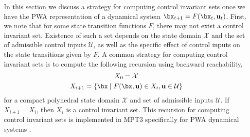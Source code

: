 In this section we discuss a strategy for computing control invariant sets once we have the PWA representation of a dynamical system $\bx_{t+1} = F(\bx_t, \mathbf{u}_t)$.
First, we note that for some state transition functions $F$, there may not exist a control invariant set.
Existence of such a set depends on the state domain $\mathcal{X}$ and the set of admissible control inputs $\mathcal{U}$, as well as the specific effect of control inputs on the state transitions given by $F$.
A common strategy for computing control invariant sets is to compute the following recursion using backward reachability,
\begin{subequations}
\begin{gather}
    X_0 = \mathcal{X} \\
    X_{i+1} = \{\bx \mid F(\bx,\mathbf{u}) \in X_{i}, \mathbf{u} \in \mathcal{U} \}
\end{gather}
\end{subequations}
for a compact polyhedral state domain $\mathcal{X}$ and set of admissible inputs $\mathcal{U}$. 
If $X_{i+1} = X_i$, then $X_i$ is a control invariant set. 
This recursion for computing control invariant sets is implemented in MPT3 specifically for PWA dynamical systems \cite{MPT3}.



